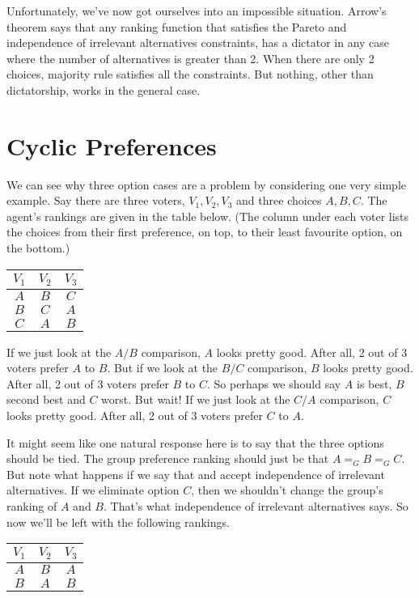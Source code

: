 \documentclass[11pt,]{article}
\begin{document}
Unfortunately, we've now got ourselves into an impossible situation.
Arrow's theorem says that any ranking function that satisfies the Pareto
and independence of irrelevant alternatives constraints, has a dictator
in any case where the number of alternatives is greater than 2. When
there are only 2 choices, majority rule satisfies all the constraints.
But nothing, other than dictatorship, works in the general case.

\hypertarget{cyclic-preferences}{%
\section{Cyclic Preferences}\label{cyclic-preferences}}

We can see why three option cases are a problem by considering one very
simple example. Say there are three voters, \(V_1, V_2, V_3\) and three
choices \(A, B, C\). The agent's rankings are given in the table below.
(The column under each voter lists the choices from their first
preference, on top, to their least favourite option, on the bottom.)

\begin{longtable}[]{@{}ccc@{}}
\toprule
\(V_1\) & \(V_2\) & \(V_3\)\tabularnewline
\midrule
\endhead
\(A\) & \(B\) & \(C\)\tabularnewline
\(B\) & \(C\) & \(A\)\tabularnewline
\(C\) & \(A\) & \(B\)\tabularnewline
\bottomrule
\end{longtable}

If we just look at the \(A/B\) comparison, \(A\) looks pretty good.
After all, 2 out of 3 voters prefer \(A\) to \(B\). But if we look at
the \(B/C\) comparison, \(B\) looks pretty good. After all, 2 out of 3
voters prefer \(B\) to \(C\). So perhaps we should say \(A\) is best,
\(B\) second best and \(C\) worst. But wait! If we just look at the
\(C/A\) comparison, \(C\) looks pretty good. After all, 2 out of 3
voters prefer \(C\) to \(A\).

It might seem like one natural response here is to say that the three
options should be tied. The group preference ranking should just be that
\(A =_G B =_G C\). But note what happens if we say that and accept
independence of irrelevant alternatives. If we eliminate option \(C\),
then we shouldn't change the group's ranking of \(A\) and \(B\). That's
what independence of irrelevant alternatives says. So now we'll be left
with the following rankings.

\begin{longtable}[]{@{}ccc@{}}
\toprule
\(V_1\) & \(V_2\) & \(V_3\)\tabularnewline
\midrule
\endhead
\(A\) & \(B\) & \(A\)\tabularnewline
\(B\) & \(A\) & \(B\)\tabularnewline
\bottomrule
\end{longtable}
\end{document}
